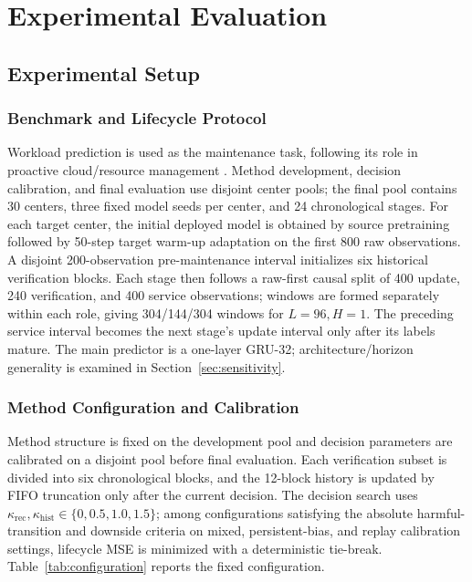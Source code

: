 \section{Experimental Evaluation}
\label{sec:experiments}
\subsection{Experimental Setup}
\subsubsection{Benchmark and Lifecycle Protocol}
Workload prediction is used as the maintenance task, following its role in proactive cloud/resource management \cite{kim2024workload,zuo2025workload,zhao2025mscnet,feng2025workloadsurvey}. Method development, decision calibration, and final evaluation use disjoint center pools; the final pool contains 30 centers, three fixed model seeds per center, and 24 chronological stages. For each target center, the initial deployed model is obtained by source pretraining followed by 50-step target warm-up adaptation on the first 800 raw observations. A disjoint 200-observation pre-maintenance interval initializes six historical verification blocks. Each stage then follows a raw-first causal split of 400 update, 240 verification, and 400 service observations; windows are formed separately within each role, giving 304/144/304 windows for $L=96,H=1$. The preceding service interval becomes the next stage's update interval only after its labels mature. The main predictor is a one-layer GRU-32; architecture/horizon generality is examined in Section~\ref{sec:sensitivity}.

\subsubsection{Method Configuration and Calibration}
Method structure is fixed on the development pool and decision parameters are calibrated on a disjoint pool before final evaluation. Each verification subset is divided into six chronological blocks, and the 12-block history is updated by FIFO truncation only after the current decision. The decision search uses $\kappa_{\mathrm{rec}},\kappa_{\mathrm{hist}}\in\{0,0.5,1.0,1.5\}$; among configurations satisfying the absolute harmful-transition and downside criteria on mixed, persistent-bias, and replay calibration settings, lifecycle MSE is minimized with a deterministic tie-break. Table~\ref{tab:configuration} reports the fixed configuration.

